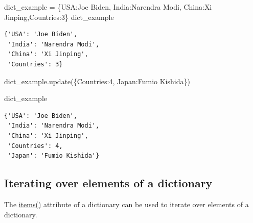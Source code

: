 \documentclass[
  letterpaper,
  DIV=11,
  numbers=noendperiod]{scrreprt}
\newenvironment{Shaded}{\begin{snugshade}}{\end{snugshade}}
\newcommand{\DecValTok}[1]{\textcolor[rgb]{0.68,0.00,0.00}{#1}}
\newcommand{\NormalTok}[1]{\textcolor[rgb]{0.00,0.23,0.31}{#1}}
\newcommand{\OperatorTok}[1]{\textcolor[rgb]{0.37,0.37,0.37}{#1}}
\newcommand{\StringTok}[1]{\textcolor[rgb]{0.13,0.47,0.30}{#1}}
\begin{document}
\begin{Shaded}
\begin{Highlighting}[]
\NormalTok{dict\_example }\OperatorTok{=}\NormalTok{ \{}\StringTok{\textquotesingle{}USA\textquotesingle{}}\NormalTok{:}\StringTok{\textquotesingle{}Joe Biden\textquotesingle{}}\NormalTok{, }\StringTok{\textquotesingle{}India\textquotesingle{}}\NormalTok{:}\StringTok{\textquotesingle{}Narendra Modi\textquotesingle{}}\NormalTok{, }\StringTok{\textquotesingle{}China\textquotesingle{}}\NormalTok{:}\StringTok{\textquotesingle{}Xi Jinping\textquotesingle{}}\NormalTok{,}\StringTok{\textquotesingle{}Countries\textquotesingle{}}\NormalTok{:}\DecValTok{3}\NormalTok{\}}
\NormalTok{dict\_example}
\end{Highlighting}
\end{Shaded}

\begin{verbatim}
{'USA': 'Joe Biden',
 'India': 'Narendra Modi',
 'China': 'Xi Jinping',
 'Countries': 3}
\end{verbatim}

\begin{Shaded}
\begin{Highlighting}[]
\NormalTok{dict\_example.update(\{}\StringTok{\textquotesingle{}Countries\textquotesingle{}}\NormalTok{:}\DecValTok{4}\NormalTok{, }\StringTok{\textquotesingle{}Japan\textquotesingle{}}\NormalTok{:}\StringTok{\textquotesingle{}Fumio Kishida\textquotesingle{}}\NormalTok{\})}
\end{Highlighting}
\end{Shaded}

\begin{Shaded}
\begin{Highlighting}[]
\NormalTok{dict\_example}
\end{Highlighting}
\end{Shaded}

\begin{verbatim}
{'USA': 'Joe Biden',
 'India': 'Narendra Modi',
 'China': 'Xi Jinping',
 'Countries': 4,
 'Japan': 'Fumio Kishida'}
\end{verbatim}

\hypertarget{iterating-over-elements-of-a-dictionary}{%
\subsection{Iterating over elements of a
dictionary}\label{iterating-over-elements-of-a-dictionary}}

The
\href{https://docs.python.org/3/tutorial/datastructures.html\#looping-techniques}{items()}
attribute of a dictionary can be used to iterate over elements of a
dictionary.
\end{document}
